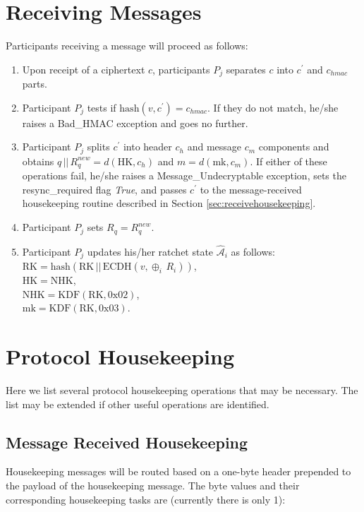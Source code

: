 \documentclass[%
preprint,
amsmath,amssymb,
aps,
prb,
floatfix,
]{revtex4-1}
\begin{document}
\section{\label{sec:receiving}Receiving Messages}
Participants receiving a message will proceed as follows:
\begin{enumerate}
\item Upon receipt of a ciphertext $c$, participants $P_j$ separates $c$ into
$c^\prime$ and $c_{hmac}$ parts.
\item Participant $P_j$ tests if $\mathrm{hash}(v, c^\prime) = c_{hmac}$. If
they do not match, he/she raises a Bad\_HMAC exception and goes no further.
\item Participant $P_j$ splits $c^\prime$ into header $c_h$ and message $c_m$ components
and obtains $q \, || \, R_q^{new} = d(\mathrm{HK}, c_h)$ and $m = d(\mathrm{mk},
c_m)$. If either of these operations fail, he/she raises a Message\_Undecryptable
exception, sets the resync\_required flag \textit{True},
and passes $c^\prime$ to the message-received housekeeping routine described in
Section \ref{sec:receivehousekeeping}.
\item Participant $P_j$ sets $R_q = R_q^{new}$.
\item Participant $P_j$ updates his/her ratchet state $\mathcal{\hat{A}}_i$ as
follows: \\
$\mathrm{RK} = \mathrm{hash}(\mathrm{RK} \, || \, \mathrm{ECDH}(v, \oplus_i
\, R_i))$, \\
$\mathrm{HK} = \mathrm{NHK}$, \\
$\mathrm{NHK} = \mathrm{KDF}(\mathrm{RK}, 0\mathrm{x}02)$, \\
$\mathrm{mk} = \mathrm{KDF}(\mathrm{RK}, 0\mathrm{x}03)$.

\end{enumerate}
\section{\label{sec:housekeeping}Protocol Housekeeping}
Here we list several protocol housekeeping operations that may be necessary.
The list may be extended if other useful operations are identified.

\subsection{\label{sec:receivehousekeeping}Message Received Housekeeping}
Housekeeping messages will be routed based on a one-byte header prepended to the
payload of the housekeeping message. The byte values and their corresponding
housekeeping tasks are (currently there is only 1): \\
\end{document}
